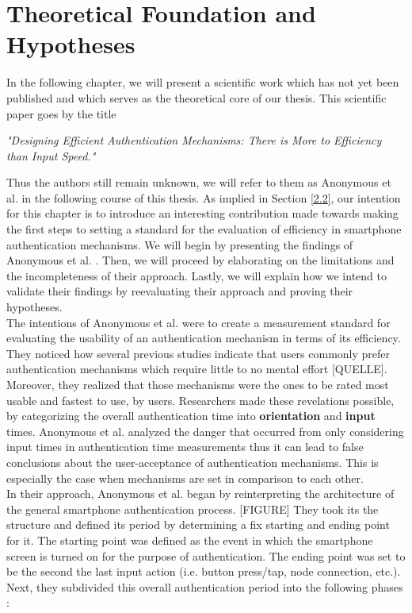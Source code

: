 
\chapter{Theoretical Foundation and Hypotheses}\label{ch:third}

In the following chapter, we will present a scientific work which has not yet been published and which serves as the theoretical core of our thesis. This scientific paper goes by the title 
\begin{center}
 \textit{"Designing Efficient Authentication Mechanisms: There is More to Efficiency than Input Speed."}   
\end{center}
Thus the authors still remain unknown, we will refer to them as Anonymous et al. \cite{anonymous} in the following course of this thesis. As implied in Section \ref{2.2}, our intention for this chapter is to introduce an interesting contribution made towards making the first steps to setting a standard for the evaluation of efficiency in smartphone authentication mechanisms. We will begin by presenting the findings of Anonymous et al. \cite{anonymous}. Then, we will proceed by elaborating on the limitations and the incompleteness of their approach. Lastly, we will explain how we intend to validate their findings by reevaluating their approach and proving their hypotheses.\\

The intentions of Anonymous et al. \cite{anonymous} were to create a measurement standard for evaluating the usability of an authentication mechanism in terms of its efficiency. They noticed how several previous studies indicate that users commonly prefer authentication mechanisms which require little to no mental effort [QUELLE]. Moreover, they realized that those mechanisms were the ones to be rated most usable and fastest to use, by users. Researchers made these revelations possible, by categorizing the overall authentication time into \textbf{orientation} and \textbf{input} times. Anonymous et al. \cite{anonymous} analyzed the danger that occurred from only considering input times in authentication time measurements thus it can lead to false conclusions about the user-acceptance of authentication mechanisms. This is especially the case when mechanisms are set in comparison to each other. \\

In their approach, Anonymous et al. \cite{anonymous} began by reinterpreting the architecture of the general smartphone authentication process. [FIGURE]
They took its the structure and defined its period by determining a fix starting and ending point for it. The starting point was defined as the event in which the smartphone screen is turned on for the purpose of authentication. The ending point was set to be the second the last input action (i.e. button press/tap, node connection, etc.). Next, they subdivided this overall authentication period into the following phases \cite{anonymous}: 

